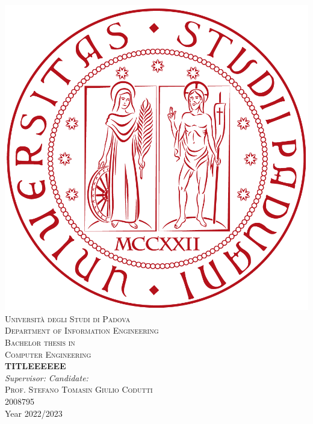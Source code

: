 



\begin{titlepage}
    \begin{center}
        \includegraphics[scale=0.1]{images/logo.png}\\

        \vspace{0.8cm}
        \textsc{\LARGE Universit\`{a} degli Studi di Padova}\\
        \vspace{0.45cm}
        \textsc{\large Department of Information Engineering}\\
        \vspace{0.4cm}
        \textsc{\large Bachelor thesis in }\\
        \textsc{\large Computer Engineering}\\
        \vfill
        { \LARGE \bfseries TITLEEEEEE
        }\\
        \vfill
        \textit{\large Supervisor:} \hfill \textit{\large Candidate:}\\
        \textsc{\large Prof. Stefano Tomasin} \hfill \textsc{Giulio Codutti}\\
        \hfill \textsc{2008795}\\

        \vfill
        {\large Year 2022/2023}
    \end{center}
\end{titlepage}


